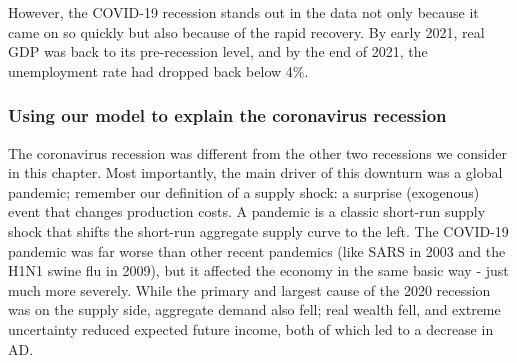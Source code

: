 \documentclass[11pt]{article} %
\begin{document}
However, the COVID-19 recession stands out in the data not only because it came on so quickly but also because of the rapid recovery. By early 2021, real GDP was back to its pre-recession level, and by the end of 2021, the unemployment rate had dropped back below 4\%.

\subsubsection*{Using our model to explain the coronavirus recession}
The coronavirus recession was different from the other two recessions we consider in this chapter. Most importantly, the main driver of this downturn was a global pandemic; remember our definition of a supply shock: a surprise (exogenous) event that changes production costs. A pandemic is a classic short-run supply shock that shifts the short-run aggregate supply curve to the left. The COVID-19 pandemic was far worse than other recent pandemics (like SARS in 2003 and the H1N1 swine flu in 2009), but it affected the economy in the same basic way - just much more severely. While the primary and largest cause of the 2020 recession was on the supply side, aggregate demand also fell; real wealth fell, and extreme uncertainty reduced expected future income, both of which led to a decrease in AD.
\end{document}
